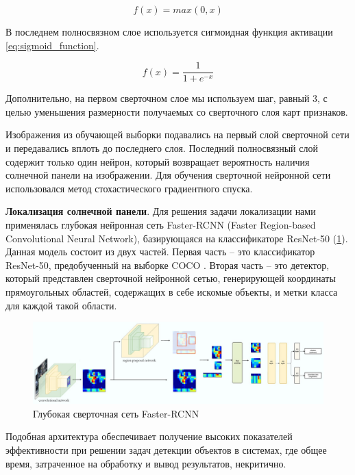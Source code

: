 \begin{equation}
    \label{eq:relu_function}
    f(x) = max(0, x)
\end{equation}

В последнем полносвязном слое используется сигмоидная функция активации \ref{eq:sigmoid_function}.

\begin{equation}
    \label{eq:sigmoid_function}
    f(x) = \frac{1}{1+e^{-x}}
\end{equation}

Дополнительно, на первом сверточном слое мы используем шаг, равный 3, с целью уменьшения размерности получаемых со сверточного слоя карт признаков.

Изображения из обучающей выборки подавались на первый слой сверточной сети и передавались вплоть до последнего слоя. Последний полносвязный слой содержит только один нейрон, который возвращает вероятность наличия солнечной панели на изображении. Для обучения сверточной нейронной сети использовался метод стохастического градиентного спуска. 

\textbf{Локализация солнечной панели}. Для решения задачи локализации нами применялась глубокая нейронная сеть Faster-RCNN (Faster Region-based Convolutional Neural Network), базирующаяся на классификаторе ResNet-50 (\ref{fig:faster_rcnn}). Данная модель состоит из двух частей. Первая часть -- это классификатор ResNet-50, предобученный на выборке COCO \cite{lin2015}. Вторая часть -- это детектор, который представлен сверточной нейронной сетью, генерирующей координаты прямоугольных областей, содержащих в себе искомые объекты, и метки класса для каждой такой области.

\begin{figure}[ht]
	\centering
	\includegraphics[width=17cm]{man-source/images/ch4/pic4-21.jpg}
	\caption{Глубокая сверточная сеть Faster-RCNN}
	\label{fig:faster_rcnn}
\end{figure}

Подобная архитектура обеспечивает получение высоких показателей эффективности при решении задач детекции объектов в системах, где общее время, затраченное на обработку и вывод результатов, некритично.

